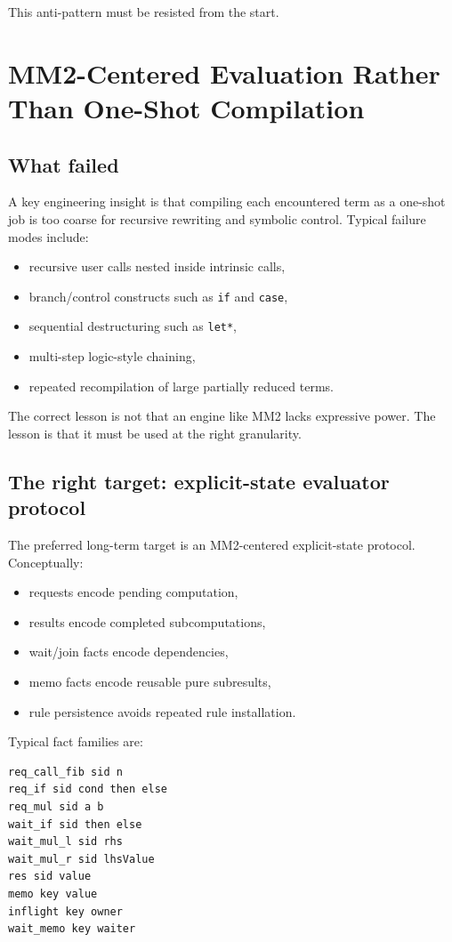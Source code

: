 \documentclass[11pt]{article}
\begin{document}
This anti-pattern must be resisted from the start.

\section{MM2-Centered Evaluation Rather Than One-Shot Compilation}

\subsection{What failed}

A key engineering insight is that compiling each encountered term as a one-shot job is too coarse for recursive rewriting and symbolic control. Typical failure modes include:
\begin{itemize}[leftmargin=2em]
  \item recursive user calls nested inside intrinsic calls,
  \item branch/control constructs such as \texttt{if} and \texttt{case},
  \item sequential destructuring such as \texttt{let*},
  \item multi-step logic-style chaining,
  \item repeated recompilation of large partially reduced terms.
\end{itemize}

The correct lesson is not that an engine like MM2 lacks expressive power. The lesson is that it must be used at the right granularity.

\subsection{The right target: explicit-state evaluator protocol}

The preferred long-term target is an MM2-centered explicit-state protocol. Conceptually:
\begin{itemize}[leftmargin=2em]
  \item requests encode pending computation,
  \item results encode completed subcomputations,
  \item wait/join facts encode dependencies,
  \item memo facts encode reusable pure subresults,
  \item rule persistence avoids repeated rule installation.
\end{itemize}

Typical fact families are:
\begin{lstlisting}[style=code]
req_call_fib sid n
req_if sid cond then else
req_mul sid a b
wait_if sid then else
wait_mul_l sid rhs
wait_mul_r sid lhsValue
res sid value
memo key value
inflight key owner
wait_memo key waiter
\end{lstlisting}
\end{document}
